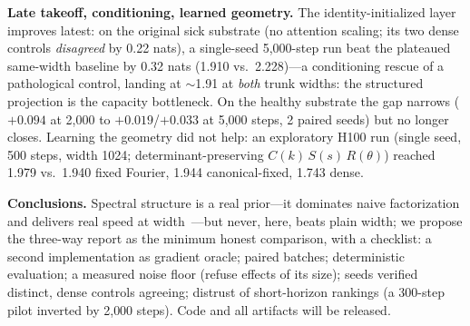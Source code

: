 \documentclass{article}
\begin{document}
\textbf{Late takeoff, conditioning, learned geometry.} The identity-initialized layer improves
latest: on the original sick substrate (no attention scaling; its two dense controls
\emph{disagreed} by 0.22 nats), a single-seed 5{,}000-step run beat the plateaued same-width
baseline by 0.32 nats (1.910 vs.\ 2.228)---a conditioning rescue of a pathological control,
landing at $\sim$1.91 at \emph{both} trunk widths: the structured projection is the capacity
bottleneck. On the healthy substrate the gap narrows ($+0.094$ at 2{,}000 to $+0.019$/$+0.033$ at
5{,}000 steps, 2 paired seeds) but no longer closes. Learning the geometry did not help: an
exploratory H100 run (single seed, 500 steps, width 1024; determinant-preserving
$C(k)\,S(s)\,R(\theta)$) reached 1.979 vs.\ 1.940 fixed Fourier, 1.944 canonical-fixed,
1.743 dense.

\textbf{Conclusions.} Spectral structure is a real prior---it dominates naive factorization and
delivers real speed at width~\cite{moczulski2016acdc,dao2019butterfly,dao2022monarch}---but
never, here, beats plain width; we propose the three-way report as the minimum honest
comparison, with a checklist: a second implementation as gradient oracle; paired batches;
deterministic evaluation; a measured noise floor (refuse effects of its size); seeds verified
distinct, dense controls agreeing; distrust of short-horizon rankings (a 300-step pilot
inverted by 2{,}000 steps). Code and all artifacts will be released.
\end{document}
